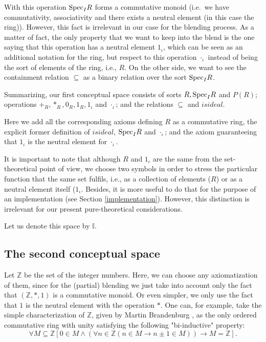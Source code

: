 With this operation ${\rm Spec}_IR$ forms a commutative monoid (i.e.\
we have commutativity, associativity and there exists a neutral
element (in this case the ring)). However, this fact is irrelevant in
our case for the blending process. As a matter of fact, the only
property that we want to keep into the blend is the one saying that
this operation has a neutral element $1_{\iota}$, which can be seen as
an additional notation for the ring, but respect to this operation
$\cdot_{\iota}$ instead of being the sort of elements of the ring,
i.e., $R$.  \newline\indent On the other side, we want to see the
containment relation $\subseteq$ as a binary relation over the sort
${\rm Spec}_IR$.

Summarizing, our first conceptual space consists of sorts $R, {\rm Spec}_IR$ and $P(R)$; operations $+_R, *_R, 0_R, 1_R, 1_{\iota}$ and $
\cdot_{\iota}$; and the relations $\subseteq$ and $isideal$.

Here we add all the corresponding axioms defining $R$ as a commutative ring, the explicit former definition of $isideal$, ${\rm Spec}_IR$ and $\cdot_{\iota}$; and the axiom guaranteeing that  $1_{\iota}$ is the neutral element for $\cdot_{\iota}$.
 
It is important to note that although $R$ and $1_{\iota}$ are the same
from the set-theoretical point of view, we choose two symbols in order
to stress the particular function that the same set fulfils, i.e., as
a collection of elements ($R$) or as a neutral element itself
($1_{\iota}$. Besides, it is more useful to do that for the purpose of
an implementation (see Section \ref{implementation}). However, this
distinction is irrelevant for our present pure-theoretical
considerations.


Let us denote this space by $\mathbb{I}$.

\subsection{The second conceptual space}
Let $\mathbb{Z}$ be the set of the integer numbers. Here, we can
choose any axiomatization of them, since for the (partial) blending we
just take into account only the fact that $(\mathbb{Z},*,1)$ is a
commutative monoid. Or even simpler, we only use the fact that $1$ is
the neutral element with the operation $*$. One can, for example, take
the simple characterization of $\mathbb{Z}$, given by Martin
Brandenburg \cite{brandenburgdobleinduction}, as the only ordered
commutative ring with unity satisfying the following "bi-inductive"
property:
\[\forall M \subseteq \mathbb{Z} \left[ 0 \in M \wedge \left(\forall n \in \mathbb{Z} \left(n\in M \rightarrow n\pm 1 \in M\right)\right) \rightarrow M=\mathbb{Z}\right].\]

